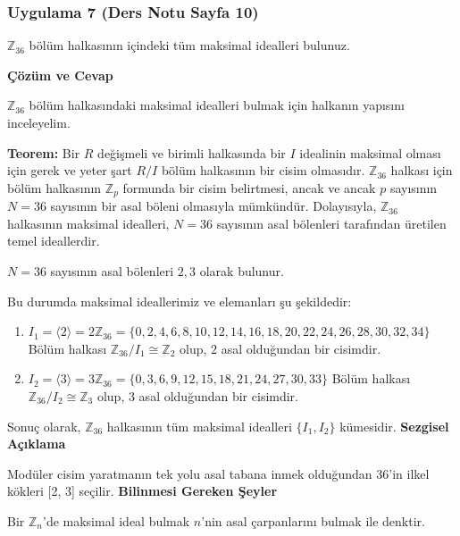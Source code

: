 \documentclass[11pt, a4paper]{article}
\newenvironment{cozum}{
    \vspace{0.5cm}
    \noindent\textcolor{green!60!black}{\faCheckCircle\enspace \textbf{\Large Çözüm ve Cevap}}\par\vspace{0.2cm}
}{}
\newenvironment{sezgisel}{
    \vspace{0.5cm}
    \noindent\textcolor{orange!80!black}{\faLightbulb\enspace \textbf{\Large Sezgisel Açıklama}}\par\vspace{0.2cm}
    \itshape
}{}
\newenvironment{bilgi}{
    \vspace{0.5cm}
    \noindent\textcolor{red!70!black}{\faExclamationTriangle\enspace \textbf{\Large Bilinmesi Gereken Şeyler}}\par\vspace{0.2cm}
}{}
\begin{document}
\newpage
\subsubsection{Uygulama 7 (Ders Notu Sayfa 10)}
\begin{sorubox}
$\mathbb{Z}_{36}$ bölüm halkasının içindeki tüm maksimal idealleri bulunuz.
\end{sorubox}
\begin{cozum}
$\mathbb{Z}_{36}$ bölüm halkasındaki maksimal idealleri bulmak için halkanın yapısını inceleyelim.

\textbf{Teorem:} Bir $R$ değişmeli ve birimli halkasında bir $I$ idealinin maksimal olması için gerek ve yeter şart $R/I$ bölüm halkasının bir cisim olmasıdır. $\mathbb{Z}_{36}$ halkası için bölüm halkasının $\mathbb{Z}_p$ formunda bir cisim belirtmesi, ancak ve ancak $p$ sayısının $N = 36$ sayısının bir asal böleni olmasıyla mümkündür. Dolayısıyla, $\mathbb{Z}_{36}$ halkasının maksimal idealleri, $N = 36$ sayısının asal bölenleri tarafından üretilen temel ideallerdir.

$N = 36$ sayısının asal bölenleri $2, 3$ olarak bulunur.

Bu durumda maksimal ideallerimiz ve elemanları şu şekildedir:
\begin{enumerate}
    \item $I_{1} = \langle 2 \rangle = 2\mathbb{Z}_{36} = \{0, 2, 4, 6, 8, 10, 12, 14, 16, 18, 20, 22, 24, 26, 28, 30, 32, 34\}$
    Bölüm halkası $\mathbb{Z}_{36} / I_{1} \cong \mathbb{Z}_{2}$ olup, $2$ asal olduğundan bir cisimdir.
    \item $I_{2} = \langle 3 \rangle = 3\mathbb{Z}_{36} = \{0, 3, 6, 9, 12, 15, 18, 21, 24, 27, 30, 33\}$
    Bölüm halkası $\mathbb{Z}_{36} / I_{2} \cong \mathbb{Z}_{3}$ olup, $3$ asal olduğundan bir cisimdir.
\end{enumerate}

Sonuç olarak, $\mathbb{Z}_{36}$ halkasının tüm maksimal idealleri $\{I_1, I_2\}$ kümesidir.
\end{cozum}
\begin{sezgisel}
Modüler cisim yaratmanın tek yolu asal tabana inmek olduğundan 36'in ilkel kökleri [2, 3] seçilir.
\end{sezgisel}
\begin{bilgi}
Bir $\mathbb{Z}_n$'de maksimal ideal bulmak $n$'nin asal çarpanlarını bulmak ile denktir.
\end{bilgi}

\newpage
\end{document}
